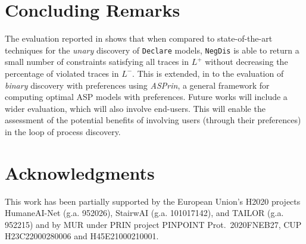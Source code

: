 \documentclass[letterpaper]{article} %
\theoremstyle{definition}
\newcommand{\nd}{\texttt{NegDis}\xspace}
\newcommand{\declare}{\texttt{Declare}\xspace}
\newcommand{\asprin}{\emph{ASPrin}\xspace}
\begin{document}
\section{Concluding Remarks}
The evaluation reported in \cite{deviant-tkde} shows that when compared to state-of-the-art techniques for the \emph{unary} discovery of \declare models, \nd is able to return a small number of constraints satisfying all traces in $L^+$ without decreasing the percentage of violated traces in $L^-$.  This is extended, in \cite{DBLP:conf/edoc/ChesaniFGGLMMMT22} to the evaluation of \emph{binary} discovery with preferences using \asprin, a general framework for computing optimal ASP models with preferences. Future works will include a wider evaluation, which will also involve end-users. This will enable the assessment of the potential benefits of involving users (through their preferences) in the loop of process discovery.  





\section{Acknowledgments}
This work has been partially supported by the European Union’s H2020 projects HumaneAI-Net (g.a. 952026), StairwAI (g.a. 101017142), and TAILOR (g.a. 952215) and by MUR under PRIN project PINPOINT Prot.~2020FNEB27, CUP H23C22000280006 and H45E21000210001.
\end{document}
